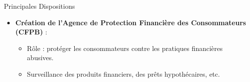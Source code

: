 \begin{frame}{Principales Dispositions}
    \begin{itemize}
        \item \textbf{Création de l'Agence de Protection Financière des Consommateurs (CFPB)} :
            \begin{itemize}
                \item Rôle : protéger les consommateurs contre les pratiques financières abusives.
                \item Surveillance des produits financiers, des prêts hypothécaires, etc.
            \end{itemize}
    \end{itemize}
\end{frame}